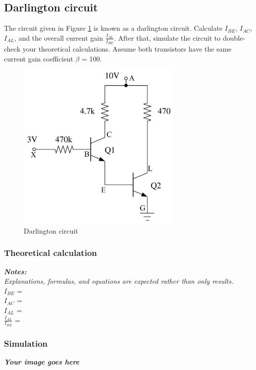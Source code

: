 \subsection{Darlington circuit}
The circuit given in Figure \ref{lab3_ex8_de} is known as a darlington circuit.
Calculate $I_{BE}$, $I_{AC}$, $I_{AL}$, and the overall current gain $\frac{I_{AL}}{I_{BE}}$. After that, simulate the circuit to double-check your theoretical calculations. Assume both transistors have the same current gain coefficient $\beta$ = 100.

\begin{figure}[H]
    \centering
    \includegraphics[width=8cm]{source/picture/bai_3/lab3_ex8_de.png}
    \caption{Darlington circuit}
    \label{lab3_ex8_de}
\end{figure}

\subsubsection{Theoretical calculation}
\textit{\textbf{Notes:}}\\
\textit{Explanations, formulas, and equations are expected rather than only results.}
\bigskip\\

$I_{BE}$ = \dotfill\bigskip\\
$I_{AC}$ = \dotfill\bigskip\\
$I_{AL}$ = \dotfill\bigskip\\
$\frac{I_{AL}}{I_{BE}}$ = \dotfill\bigskip\\

\newpage

\subsubsection{Simulation}
\textbf{\textit{Your image goes here}}
\vspace{8cm}
\\

